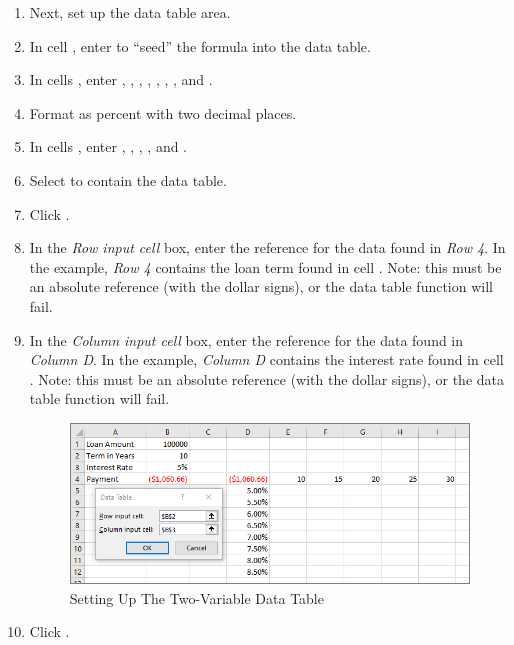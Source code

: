 \begin{enumbox}
\begin{enumerate}
		\item Next, set up the data table area.
		\item In cell , enter  to ``seed'' the  formula into the data table.
		\item In cells , enter , , , , , , , and .
		\item Format  as percent with two decimal places.
		\item In cells , enter , , , , and .
		\item Select  to contain the data table.
		\item Click .
		\item In the \textit{Row input cell} box, enter the reference for the data found in \textit{Row 4}. In the example, \textit{Row 4} contains the loan term found in cell . Note: this must be an absolute reference (with the dollar signs), or the data table function will fail.
		\item In the \textit{Column input cell} box, enter the reference for the data found in \textit{Column D}. In the example, \textit{Column D} contains the interest rate found in cell . Note: this must be an absolute reference (with the dollar signs), or the data table function will fail.
	
		\begin{figure}[H]
			\centering
			\includegraphics[width=\maxwidth{.95\linewidth}]{gfx/ch08_fig44}
			\caption{Setting Up The Two-Variable Data Table}
			\label{08:fig44}
		\end{figure}
	
		\item Click .
	\end{enumerate}
\end{enumbox}
	
